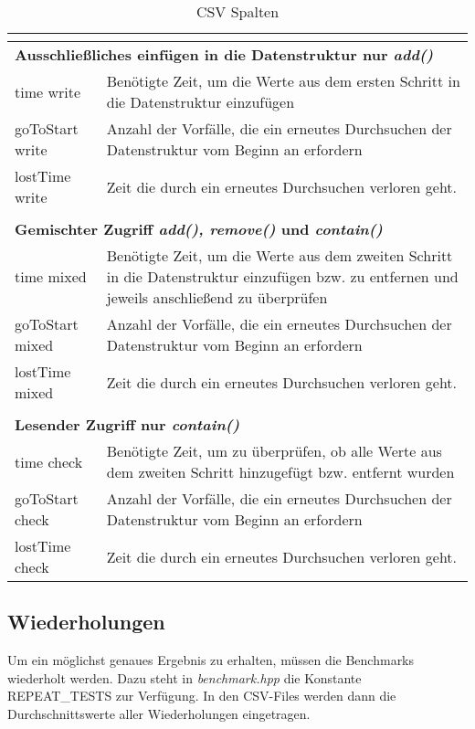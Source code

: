\begin{table}[H]
\begin{tabular}{ |m{2.5cm}|  m{13cm}| }
	 \multicolumn{2}{l}{} \\ \hline
	 \multicolumn{2}{|l|}{\textbf{Ausschließliches einfügen in die Datenstruktur nur \textit{add()}}}    \\ \hline
	 time write& 	Benötigte Zeit, um die Werte aus dem ersten Schritt in die Datenstruktur einzufügen\\ \hline
	 goToStart write& Anzahl der Vorfälle, die ein erneutes Durchsuchen der Datenstruktur vom Beginn an erfordern\\ \hline
	 lostTime write&  Zeit die durch ein erneutes Durchsuchen verloren geht.\\ \hline
	 \multicolumn{2}{l}{} \\ \hline
	 \multicolumn{2}{|l|}{\textbf{Gemischter Zugriff \textit{add(), remove()} und \textit{contain()}}}    \\ \hline
	 time mixed& 	Benötigte Zeit, um die Werte aus dem zweiten Schritt in die Datenstruktur einzufügen 
	 				bzw. zu entfernen und jeweils anschließend zu überprüfen\\ \hline
	 goToStart mixed& Anzahl der Vorfälle, die ein erneutes Durchsuchen der Datenstruktur vom Beginn an erfordern\\ \hline
	 lostTime mixed& Zeit die durch ein erneutes Durchsuchen verloren geht.\\ \hline
	 \multicolumn{2}{l}{} \\ \hline
	 \multicolumn{2}{|l|}{\textbf{Lesender Zugriff nur \textit{contain()}}}    \\ \hline
	 time check& Benötigte Zeit, um zu überprüfen, ob alle Werte aus dem zweiten Schritt hinzugefügt bzw. entfernt wurden \\ \hline
	 goToStart check& Anzahl der Vorfälle, die ein erneutes Durchsuchen der Datenstruktur vom Beginn an erfordern\\ \hline
	 lostTime check& Zeit die durch ein erneutes Durchsuchen verloren geht.\\ \hline
	\end{tabular} 
	\caption{CSV Spalten}
	\label{tab:csv}
	\end{table}

\subsection{Wiederholungen}
Um ein möglichst genaues Ergebnis zu erhalten, müssen die Benchmarks wiederholt werden. Dazu steht in \textit{benchmark.hpp}
die Konstante REPEAT\_TESTS zur Verfügung. In den CSV-Files werden dann die Durchschnittswerte aller Wiederholungen eingetragen.